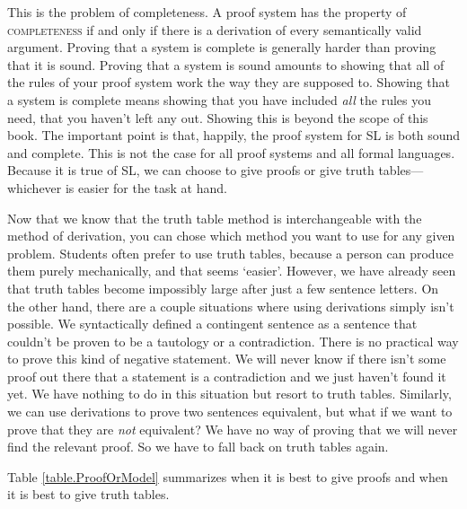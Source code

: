 {This is the problem of completeness. A proof system has the property of  \textsc{\gls{completeness}} \label{def:completeness} if and only if there is a derivation of every semantically valid argument. Proving that a system is complete is generally harder than proving that it is sound. Proving that a system is sound amounts to showing that all of the rules of your proof system work the way they are supposed to. Showing that a system is complete means showing that you have included \emph{all} the rules you need, that you haven't left any out. Showing this is beyond the scope of this book. The important point is that, happily, the proof system for SL is both sound and complete. This is not the case for all proof systems and all formal languages. Because it is true of SL, we can choose to give proofs or give truth tables---whichever is easier for the task at hand.

Now that we know that the truth table method is interchangeable with the method of derivation, you can chose which method you want to use for any given problem. Students often prefer to use truth tables, because a person can produce them purely mechanically, and that seems `easier'. However, we have already seen that truth tables become impossibly large after just a few sentence letters. On the other hand, there are a couple situations where using derivations simply isn't possible. We syntactically defined a contingent sentence as a sentence that couldn't be proven to be a tautology or a contradiction. There is no practical way to prove this kind of negative statement. We will never know if there isn't some proof out there that a statement is a contradiction and we just haven't found it yet. We have nothing to do in this situation but resort to truth tables. Similarly, we can use derivations to prove two sentences equivalent, but what if we want to prove that they are \emph{not} equivalent? We have no way of proving that we will never find the relevant proof. So we have to fall back on truth tables again.

Table \ref{table.ProofOrModel} summarizes when it is best to give proofs and when it is best to give truth tables. 

}
